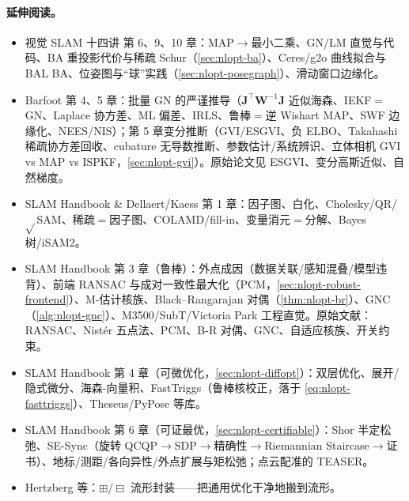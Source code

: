 \paragraph{延伸阅读。}
\begin{itemize}
  \item 视觉 SLAM 十四讲\cite{gaoxiang2019slam14} 第 6、9、10 章：MAP$\to$最小二乘、GN/LM 直觉与代码、BA 重投影代价与稀疏 Schur（\cref{sec:nlopt-ba}）、Ceres/g2o 曲线拟合与 BAL BA、位姿图与“球”实践（\cref{sec:nlopt-posegraph}）、滑动窗口边缘化。
  \item Barfoot\cite{barfoot2024state} 第 4、5 章：批量 GN 的严谨推导（$\mathbf{J}^\top\mathbf{W}^{-1}\mathbf{J}$ 近似海森、IEKF$=$GN、Laplace 协方差、ML 偏差、IRLS、鲁棒$=$逆 Wishart MAP、SWF 边缘化、NEES/NIS）；第 5 章变分推断（GVI/ESGVI、负 ELBO、Takahashi 稀疏协方差回收、cubature 无导数推断、参数估计/系统辨识、立体相机 GVI vs MAP vs ISPKF，\cref{sec:nlopt-gvi}）。原始论文见 ESGVI\cite{barfoot2020esgvi}、变分高斯近似\cite{opper2009variational}、自然梯度\cite{amari1998natural}。
  \item SLAM Handbook\cite{carlone2026handbook} \& Dellaert/Kaess\cite{dellaert2017factor} 第 1 章：因子图、白化、Cholesky/QR/$\sqrt{}$SAM、稀疏$=$因子图、COLAMD/fill-in、变量消元$=$分解、Bayes 树/iSAM2。
  \item SLAM Handbook\cite{carlone2026handbook} 第 3 章（鲁棒）：外点成因（数据关联/感知混叠/模型违背）、前端 RANSAC 与成对一致性最大化（PCM，\cref{sec:nlopt-robust-frontend}）、M-估计核族、Black--Rangarajan 对偶（\cref{thm:nlopt-br}）、GNC（\cref{alg:nlopt-gnc}）、M3500/SubT/Victoria Park 工程直觉。原始文献：RANSAC\cite{fischler1981ransac}、Nistér 五点法\cite{nister2004fivepoint}、PCM\cite{mangelson2018pcm}、B-R 对偶\cite{black1996rangarajan}、GNC\cite{yang2020gnc}、自适应核族\cite{barron2019general}、开关约束\cite{sunderhauf2012switchable}。
  \item SLAM Handbook\cite{carlone2026handbook} 第 4 章（可微优化，\cref{sec:nlopt-diffopt}）：双层优化、展开/隐式微分、海森-向量积、FastTriggs（鲁棒核校正，落于 \cref{eq:nlopt-fasttriggs}）、Theseus/PyPose 等库。
  \item SLAM Handbook\cite{carlone2026handbook} 第 6 章（可证最优，\cref{sec:nlopt-certifiable}）：Shor 半定松弛、SE-Sync\cite{rosen2019sesync}（旋转 QCQP$\to$SDP$\to$精确性$\to$Riemannian Staircase$\to$证书）、地标/测距/各向异性/外点扩展与矩松弛；点云配准的 TEASER\cite{yang2021teaser}。
  \item Hertzberg 等\cite{hertzberg2013integrating}：$\boxplus/\boxminus$ 流形封装——把通用优化干净地搬到流形。
\end{itemize}

